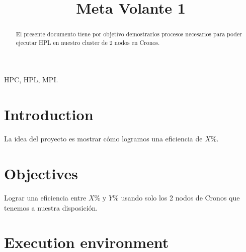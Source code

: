 \documentclass[conference]{IEEEtran}
\begin{document}
\title{Meta Volante 1}

\author{
\and
{}
\and
{}
\and
{}
}

\maketitle

\begin{abstract}
El presente documento tiene por objetivo demostrarlos procesos necesarios para poder ejecutar HPL en
nuestro cluster de 2 nodos en Cronos. 
\end{abstract}

\begin{IEEEkeywords}
HPC, HPL, MPI.
\end{IEEEkeywords}

\section{Introduction}
La idea del proyecto es mostrar cómo logramos una eficiencia de \( X\% \).

\section{Objectives}
Lograr una eficiencia entre \( X\% \) y \( Y\% \) usando solo los 2 nodos de Cronos que tenemos
a nuestra disposición.

\section{Execution environment}
\end{document}
